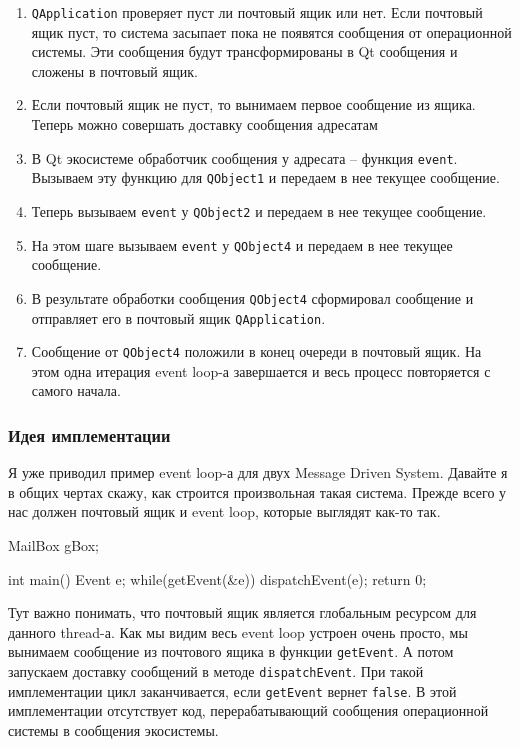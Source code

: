 \begin{enumerate}
\item \verb"QApplication" проверяет пуст ли почтовый ящик или нет.
Если почтовый ящик пуст, то система засыпает пока не появятся сообщения от операционной системы.
Эти сообщения будут трансформированы в Qt сообщения и сложены в почтовый ящик.

\item Если почтовый ящик не пуст, то вынимаем первое сообщение из ящика.
Теперь можно совершать доставку сообщения адресатам

\item В Qt экосистеме обработчик сообщения у адресата -- функция \verb"event".
Вызываем эту функцию для \verb"QObject1" и передаем в нее текущее сообщение.

\item Теперь вызываем \verb"event" у \verb"QObject2" и передаем в нее текущее сообщение.

\item На этом шаге вызываем \verb"event" у \verb"QObject4" и передаем в нее текущее сообщение.

\item В результате обработки сообщения \verb"QObject4" сформировал сообщение и отправляет его в почтовый ящик \verb"QApplication".

\item Сообщение от \verb"QObject4" положили в конец очереди в почтовый ящик.
На этом одна итерация event loop-а завершается и весь процесс повторяется с самого начала.
\end{enumerate}


\subsubsection{Идея имплементации}

Я уже приводил пример event loop-а для двух Message Driven System.
Давайте я в общих чертах скажу, как строится произвольная такая система.
Прежде всего у нас должен почтовый ящик и event loop, которые выглядят как-то так.
\begin{cppcode}
MailBox gBox;

int main() {
  Event e;
  while(getEvent(&e)) {
    dispatchEvent(e);
  }
  return 0;
}
\end{cppcode}
Тут важно понимать, что почтовый ящик является глобальным ресурсом для данного thread-а.
Как мы видим весь event loop устроен очень просто, мы вынимаем сообщение из почтового ящика в функции \verb"getEvent".
А потом запускаем доставку сообщений в методе \verb"dispatchEvent".
При такой имплементации цикл заканчивается, если \verb"getEvent" вернет \verb"false".
В этой имплементации отсутствует код, перерабатывающий сообщения операционной системы в сообщения экосистемы.

